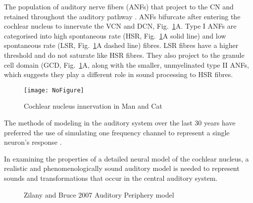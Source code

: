 The population of auditory nerve fibers (ANFs) that project to the CN
and retained throughout the auditory pathway
\citep{Lorente:1981}. ANFs bifurcate after entering the cochlear
nucleus to innervate the VCN and DCN, Fig.~\ref{fig:CNdiagram}A. Type
I ANFs are categorised into high spontaneous rate (HSR,
Fig.~\ref{fig:CNdiagram}A solid line) and low spontaneous rate (LSR,
Fig.~\ref{fig:CNdiagram}A dashed line) fibres. LSR fibres have a
higher threshold and do not saturate like HSR fibres. They also
project to the granule cell domain (GCD, Fig.~\ref{fig:CNdiagram}A,
\citep{RyugoParks:2003,RyugoHaenggeliEtAl:2003} along with the
smaller, unmyelinated type II ANFs, which suggests they play a
different role in sound processing to HSR fibres.


\begin{figure}[tbh]
  \begin{center}
    \texttt{[image: NoFigure]}
    \caption{Cochlear nucleus innervation in Man and Cat }
    \label{fig:CNdiagram}
  \end{center}
\end{figure}


\medskip{}

 The methods of
modeling in the auditory system over the last 30 years have preferred
the use of simulating one frequency channel to represent a single
neuron's response \citep{DavisVoigt:1991,Carney:1993}.


%
\medskip{}

In examining the properties of a detailed neural model of the cochlear
nucleus, a realistic and phenomenologically sound auditory model is
needed to represent sounds and transformations that occur in the
central auditory system.

\begin{figure}[tbh]
  \begin{center}


    \caption{Zilany and Bruce 2007 Auditory Periphery model}
    \label{fig:ZilanyBruceFig}
  \end{center}
\end{figure}


